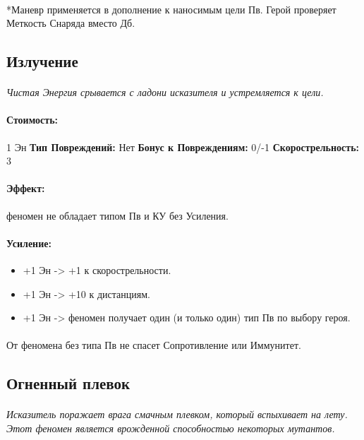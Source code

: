 \paragraph{}*Маневр применяется в дополнение к наносимым цели Пв. Герой проверяет Меткость Снаряда вместо Дб.
\subsection{Излучение}
\paragraph{} 
\textit{Чистая Энергия срывается с ладони исказителя и устремляется к цели.}
\paragraph{Стоимость: }1 Эн
\newline
\textbf{Тип Повреждений: }Нет
\newline
\textbf{Бонус к Повреждениям: }0/-1
\newline
\textbf{Скорострельность: }3
\paragraph{Эффект: }феномен не обладает типом Пв и КУ без Усиления.
\paragraph{Усиление:}
\begin{itemize}
\item+1 Эн -> +1 к скорострельности.
\item+1 Эн -> +10 к дистанциям.
\item+1 Эн -> феномен получает один (и только один) тип Пв по выбору героя.
\end{itemize}
\paragraph{}
\begin{tcolorbox} От феномена без типа Пв не спасет Сопротивление или Иммунитет. 
\end{tcolorbox}
\subsection{Огненный плевок}
\paragraph{} 
\textit{Исказитель поражает врага смачным плевком, который вспыхивает на лету. Этот феномен является врожденной способностью некоторых мутантов.}
